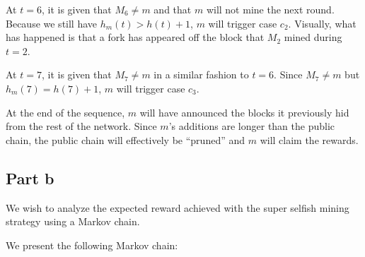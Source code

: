 \documentclass[12pt]{article}%
\begin{document}
At $t = 6$, it is given that $M_6 \neq m$ and that $m$ will not mine the next round. Because we still have $h_{m}(t) > h(t) + 1$, $m$ will trigger case $c_2$. Visually, what has happened is that a fork has appeared off the block that $M_2$ mined during $t = 2$.

At $t = 7$, it is given that $M_7 \neq m$ in a similar fashion to $t = 6$. Since $M_7 \neq m$ but $h_{m}(7) = h(7) + 1$, $m$ will trigger case $c_3$.

At the end of the sequence, $m$ will have announced the blocks it previously hid from the rest of the network. Since $m$'s additions are longer than the public chain, the public chain will effectively be “pruned” and $m$ will claim the rewards.

\subsection*{Part b}
We wish to analyze the expected reward achieved with the super selfish mining strategy using a Markov chain.

We present the following Markov chain:
\end{document}
